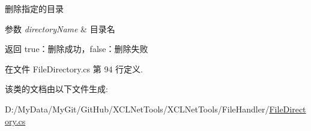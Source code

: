 删除指定的目录 


\begin{DoxyParams}{参数}
{\em directory\-Name} & 目录名\\
\hline
\end{DoxyParams}
\begin{DoxyReturn}{返回}
true：删除成功，false：删除失败
\end{DoxyReturn}


在文件 File\-Directory.\-cs 第 94 行定义.



该类的文档由以下文件生成\-:\begin{DoxyCompactItemize}
\item 
D\-:/\-My\-Data/\-My\-Git/\-Git\-Hub/\-X\-C\-L\-Net\-Tools/\-X\-C\-L\-Net\-Tools/\-File\-Handler/\hyperlink{_file_directory_8cs}{File\-Directory.\-cs}\end{DoxyCompactItemize}
